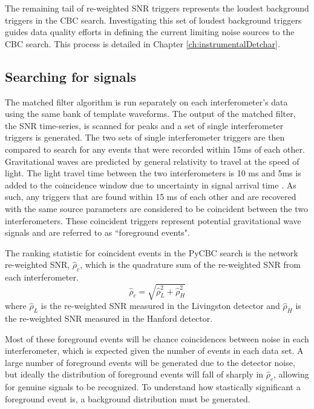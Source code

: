 The remaining tail of re-weighted SNR triggers represents the loudest 
background triggers in the CBC search. Investigating this set of
loudest background triggers guides data quality efforts in defining the current 
limiting noise sources to the CBC search. This process is detailed in Chapter 
\ref{ch:instrumentalDetchar}.

\subsection{Searching for signals}

The matched filter algorithm is run separately on each interferometer's data using the 
same bank 
of template waveforms. The output of the matched filter, the SNR time-series, is scanned 
for peaks and a set of single interferometer 
triggers is generated. The two sets of single interferometer triggers are then compared to
search for any events that were recorded within 15ms of each other.
Gravitational waves are predicted by general relativity to travel
at the speed of light. The light travel time between the two interferometers is 10 ms
and 5ms is added to the coincidence window due to uncertainty in signal arrival time
\cite{GW150914-CBC}.
As such, any triggers that are found within 15 ms of each other and
are recovered with the same source parameters are considered to be coincident between 
the two
interferometers. These coincident triggers represent potential gravitational wave signals
and are referred to as ``foreground events". 

The ranking statistic for coincident events in the PyCBC search is the network
re-weighted SNR, $\hat{\rho}_{c}$, which is the quadrature sum of the re-weighted
SNR from each interferometer.  
\begin{equation}
\hat{\rho}_{c} = \sqrt{\hat{\rho}^2_L + \hat{\rho}^2_H}
\end{equation}
where $\hat{\rho}_L$ is the re-weighted SNR measured in the Livingston detector 
and $\hat{\rho}_H$ is the re-weighted SNR measured in the Hanford detector.

Most of these foreground events will be
chance coincidences between noise in each interferometer, which is expected given
the number of events in each data set. A large number of foreground events will be 
generated due to the detector noise, but ideally the distribution of foreground events 
will fall of sharply in $\hat{\rho}_{c}$, allowing for genuine signals to be 
recognized. To understand how stastically significant a foreground event is, a background 
distribution must be generated.

